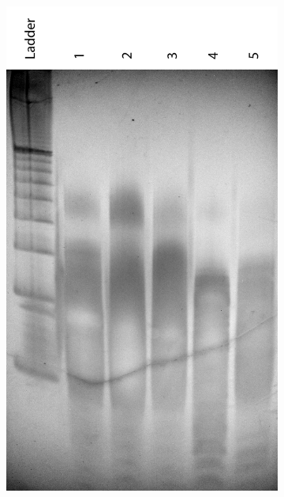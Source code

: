 \begin{figure}[h]
\begin{subfigure}[t]{.43\textwidth}
  \includegraphics[width=\textwidth]{images/translator_transcription_3.png}
  \caption{}
  \label{translator_transcription_3}
\end{subfigure}
\begin{subfigure}[t]{.55\textwidth}

\end{subfigure}
\end{figure}
